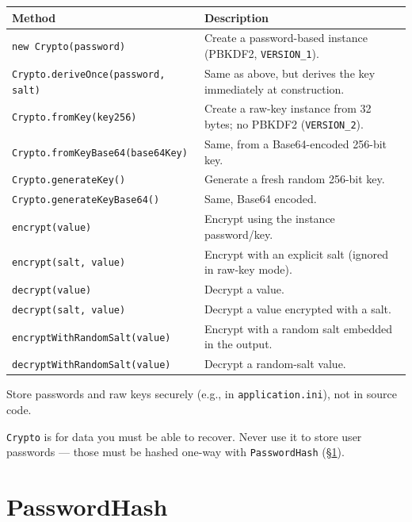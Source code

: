 \begin{longtable}{P{5.4cm}P{5.1cm}}
\toprule
\textbf{Method} & \textbf{Description} \\
\midrule
\endhead
\texttt{new Crypto(password)} & Create a password-based instance (PBKDF2, \texttt{VERSION\_1}). \\
\texttt{Crypto.deriveOnce(password, salt)} & Same as above, but derives the key immediately at construction. \\
\texttt{Crypto.fromKey(key256)} & Create a raw-key instance from 32 bytes; no PBKDF2 (\texttt{VERSION\_2}). \\
\texttt{Crypto.\allowbreak fromKeyBase64(\allowbreak base64Key)} & Same, from a Base64-encoded 256-bit key. \\
\texttt{Crypto.generateKey()} & Generate a fresh random 256-bit key. \\
\texttt{Crypto.generateKeyBase64()} & Same, Base64 encoded. \\
\texttt{encrypt(value)} & Encrypt using the instance password/key. \\
\texttt{encrypt(salt, value)} & Encrypt with an explicit salt (ignored in raw-key mode). \\
\texttt{decrypt(value)} & Decrypt a value. \\
\texttt{decrypt(salt, value)} & Decrypt a value encrypted with a salt. \\
\texttt{encryptWithRandomSalt(\allowbreak value)} & Encrypt with a random salt embedded in the output. \\
\texttt{decryptWithRandomSalt(\allowbreak value)} & Decrypt a random-salt value. \\
\bottomrule
\end{longtable}

\begin{warnbox}
Store passwords and raw keys securely (e.g., in \texttt{application.ini}), not in source code.
\end{warnbox}

\begin{warnbox}
\texttt{Crypto} is for data you must be able to recover.  Never use it to store user passwords --- those must be hashed one-way with \texttt{PasswordHash} (\S\ref{sec:util-passwordhash}).
\end{warnbox}

\section{PasswordHash}
\label{sec:util-passwordhash}

